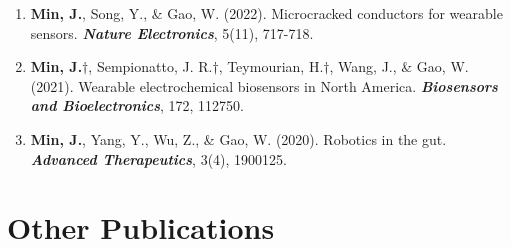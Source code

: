 \documentclass[11pt,a4paper]{article}
\begin{document}
\begin{enumerate}[leftmargin=*, itemsep=2pt, parsep=0pt, topsep=2pt]
  \item \textbf{Min, J.}, Song, Y., \& Gao, W. (2022). Microcracked conductors for wearable sensors. \textbf{\textit{Nature Electronics}}, 5(11), 717-718.
  \item \textbf{Min, J.}$\dagger$, Sempionatto, J. R.$\dagger$, Teymourian, H.$\dagger$, Wang, J., \& Gao, W. (2021). Wearable electrochemical biosensors in North America. \textbf{\textit{Biosensors and Bioelectronics}}, 172, 112750.
  \item \textbf{Min, J.}, Yang, Y., Wu, Z., \& Gao, W. (2020). Robotics in the gut. \textbf{\textit{Advanced Therapeutics}}, 3(4), 1900125.
\end{enumerate}

\section{Other Publications}
\end{document}
